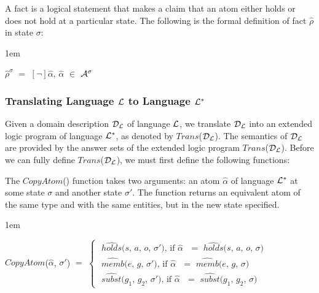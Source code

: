 \documentclass[11pt]{report}
\newenvironment{vquote}
{
  \begin{list}{}{\leftmargin 1em}\item[]
}
{
  \end{list}
}
\begin{document}
            A fact is a logical statement that makes a claim that an atom
            either holds or does not hold at a particular state. The
            following is the formal definition of fact $\hat{\rho}$ in
            state $\sigma$:

            \begin{vquote}
              $\hat{\rho}^{\sigma}$ $=$
                $[\lnot]$$\hat{\alpha}$,
                $\hat{\alpha}$ $\in$ ${\cal A}^{\sigma}$
            \end{vquote}

        \subsubsection{Translating Language ${\cal L}$ to Language ${\cal L^{*}}$}

          Given a domain description ${\cal D_{L}}$ of language ${\cal L}$, we
          translate ${\cal D_{L}}$ into an extended logic program of language
          ${\cal L^{*}}$, as denoted by $Trans$(${\cal D_{L}}$). The semantics
          of ${\cal D_{L}}$ are provided by the answer sets of the extended
          logic program $Trans$(${\cal D_{L}}$). Before we can fully define
          $Trans$(${\cal D}_{\cal L}$), we must first define the following
          functions:

          The $CopyAtom$() function takes two arguments: an atom $\hat{\alpha}$
          of language ${\cal L}^{*}$ at some state $\sigma$ and another state
          $\sigma'$. The function returns an equivalent atom of the same type
          and with the same entities, but in the new state specified.

          \begin{vquote}
            $CopyAtom$($\hat{\alpha}$, $\sigma'$)
            $=$
            \begin{math}
              \begin{cases}
                \mbox{
                  $\hat{holds}$($s$, $a$, $o$, $\sigma'$),
                    if $\hat{\alpha}$ $=$
                      $\hat{holds}$($s$, $a$, $o$, $\sigma$)
                } \\
                \mbox{
                  $\hat{memb}$($e$, $g$, $\sigma'$),
                    if $\hat{\alpha}$ $=$
                      $\hat{memb}$($e$, $g$, $\sigma$)
                } \\
                \mbox{
                  $\hat{subst}$($g_{1}$, $g_{2}$, $\sigma'$),
                    if $\hat{\alpha}$ $=$
                      $\hat{subst}$($g_{1}$, $g_{2}$, $\sigma$)
                }
              \end{cases}
            \end{math}
          \end{vquote}
\end{document}
